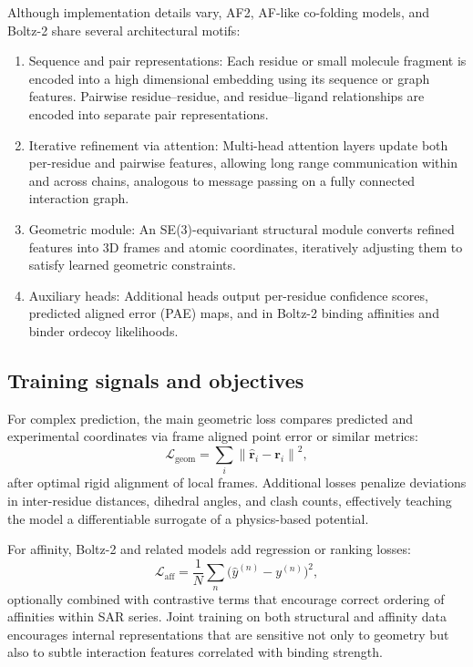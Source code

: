 \documentclass[12pt]{article}
\begin{document}
Although implementation details vary, AF2, AF-like co-folding models, and Boltz-2 share several architectural motifs:\cite{CH13_jumper2021alphafold,CH13_alphafoldreview2021,CH13_proteinpredictionuntilcasp15,CH13_passaro2025boltz2}
\begin{enumerate}
  \item Sequence and pair representations: Each residue or small molecule fragment is encoded into a high dimensional embedding using its sequence or graph features. Pairwise residue–residue, and residue–ligand relationships are encoded into separate pair representations.
  \item Iterative refinement via attention: Multi-head attention layers update both per-residue and pairwise features, allowing long range communication within and across chains, analogous to message passing on a fully connected interaction graph.
  \item Geometric module: An SE(3)-equivariant structural module converts refined features into 3D frames and atomic coordinates, iteratively adjusting them to satisfy learned geometric constraints.
  \item Auxiliary heads: Additional heads output per-residue confidence scores, predicted aligned error (PAE) maps, and in Boltz-2 binding affinities and binder ordecoy likelihoods.\cite{CH13_passaro2025boltz2}
\end{enumerate}

\subsection{Training signals and objectives}

For complex prediction, the main geometric loss compares predicted and experimental coordinates via frame aligned point error or similar metrics:
\[
\mathcal{L}_{\text{geom}} = \sum_{i} \left\| \hat{\mathbf{r}}_i - \mathbf{r}_i \right\|^2,
\]
after optimal rigid alignment of local frames. Additional losses penalize deviations in inter-residue distances, dihedral angles, and clash counts, effectively teaching the model a differentiable surrogate of a physics-based potential.\cite{CH13_jumper2021alphafold,CH13_alphafoldreview2021,CH13_passaro2025boltz2}

For affinity, Boltz-2 and related models add regression or ranking losses:
\[
\mathcal{L}_{\text{aff}} = \frac{1}{N} \sum_{n} \big(\hat{y}^{(n)} - y^{(n)}\big)^2,
\]
optionally combined with contrastive terms that encourage correct ordering of affinities within SAR series. Joint training on both structural and affinity data encourages internal representations that are sensitive not only to geometry but also to subtle interaction features correlated with binding strength.\cite{CH13_passaro2025boltz2}
\end{document}
